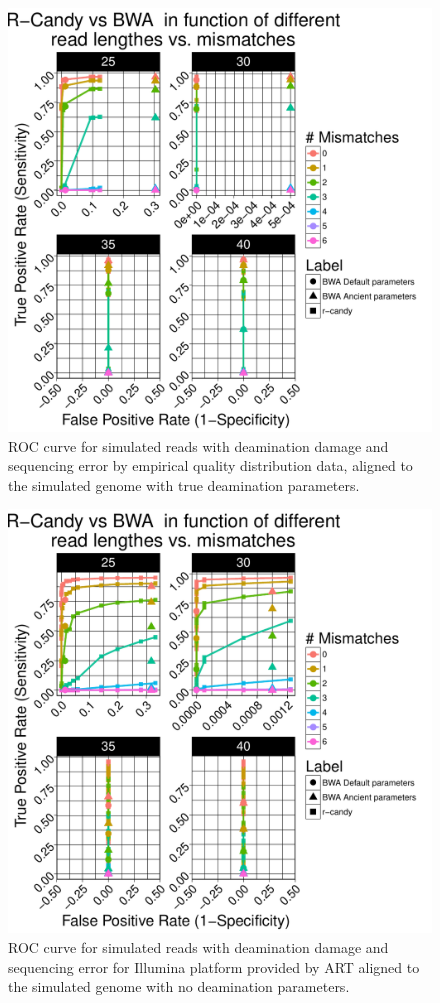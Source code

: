 \documentclass[11pt,a4paper]{report}
\begin{document}
\begin{figure}[H]
\centering
\includegraphics[width=12cm]{pictures/bROC_DS2_emp.pdf}
\caption{ROC curve for simulated reads with deamination damage and sequencing error 
by empirical quality distribution data, aligned to the simulated genome
         with true deamination parameters.}
\label{DS2_emp}
\end{figure}

\begin{figure}[H]
\centering
\includegraphics[width=12cm]{pictures/bROC_DS2_ART.pdf}
\caption{ROC curve for simulated reads with deamination damage and sequencing error 
for Illumina platform provided by ART aligned to the simulated genome
         with no deamination parameters.}
\label{DS2_ART}
\end{figure}
\end{document}

